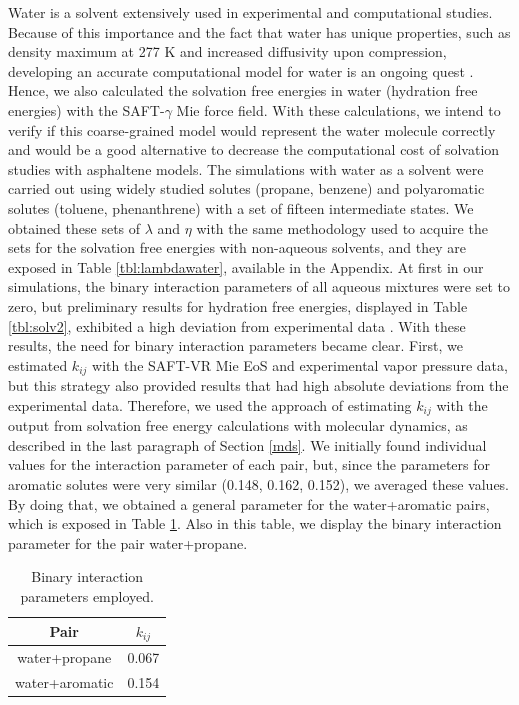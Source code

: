 \documentclass[final,12p,times,twocolumn]{elsarticle}
\begin{document}
Water is a solvent extensively used in experimental and computational studies. Because of this importance and the fact that water has unique properties, such as density maximum at 277 K and increased diffusivity upon compression, developing an accurate computational model for water is an ongoing quest \cite{hadley2012}. Hence, we also calculated the solvation free energies in water (hydration free energies) with the SAFT-$\gamma$ Mie force field. With these calculations, we intend to verify if this coarse-grained model would represent the water molecule correctly and would be a good alternative to decrease the computational cost of solvation studies with asphaltene models. The simulations with water as a solvent were carried out using widely studied solutes (propane, benzene) and polyaromatic solutes (toluene, phenanthrene) with a set of fifteen intermediate states.  We obtained these sets of $\lambda$ and $\eta$ with the same methodology used to acquire the sets for the solvation free energies with non-aqueous solvents, and they are exposed in Table \ref{tbl:lambdawater}, available in the Appendix. At first in our simulations, the binary interaction parameters of all aqueous mixtures were set to zero, but preliminary results for hydration free energies, displayed in Table \ref{tbl:solv2},  exhibited a high deviation from experimental data \cite{P29900000291, doi:10.1021/ct050097l}. With these results, the need for binary interaction parameters became clear. First, we estimated $k_{ij}$ with the SAFT-VR Mie EoS and experimental vapor pressure data, but this strategy also provided results that had high absolute deviations from the experimental data. Therefore, we used the approach of estimating $k_{ij}$ with the output from solvation free energy calculations with molecular dynamics, as described in the last paragraph of Section \ref{mds}.  We initially found individual values for the interaction parameter of each pair, but, since the parameters for aromatic solutes were very similar (0.148, 0.162, 0.152), we averaged these values. By doing that,  we obtained a general parameter for the water+aromatic pairs, which is exposed in Table \ref{tbl:kij}. Also in this table, we display the binary interaction parameter for the pair water+propane. 
	
	\begin{table}
		\centering
		\caption{Binary interaction parameters employed.}
		\label{tbl:kij}
		\begin{tabular}{cc}
			\hline\hline
			Pair              & $k_{ij}$ \\ \hline
			water+propane  & 0.067    \\
			water+aromatic & 0.154    \\ \hline\hline
		\end{tabular}
	\end{table}
	
\end{document}
